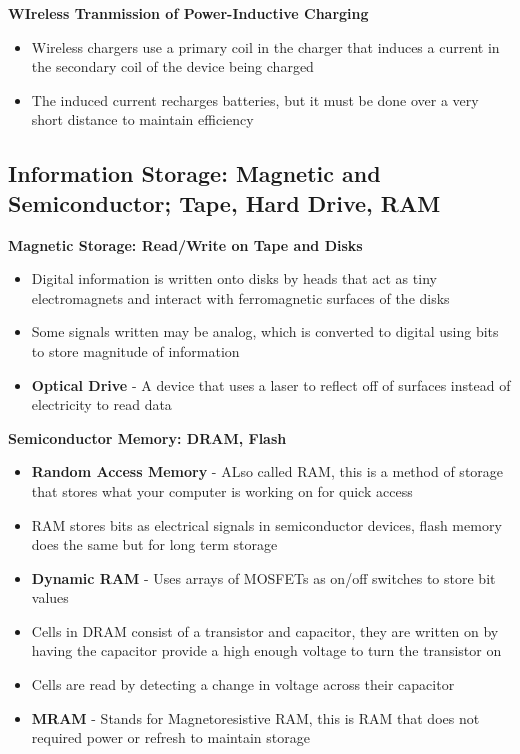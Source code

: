 \textbf{WIreless Tranmission of Power-Inductive Charging}
\begin{itemize}
    \item Wireless chargers use a primary coil in the charger that induces a current in the secondary coil of the device being charged
    \item The induced current recharges batteries, but it must be done over a very short distance to maintain efficiency
\end{itemize}

\subsection{Information Storage: Magnetic and Semiconductor; Tape, Hard Drive, RAM}
\textbf{Magnetic Storage: Read/Write on Tape and Disks}
\begin{itemize}
    \item Digital information is written onto disks by heads that act as tiny electromagnets and interact with ferromagnetic surfaces of the disks
    \item Some signals written may be analog, which is converted to digital using bits to store magnitude of information
    \item \textbf{Optical Drive} - A device that uses a laser to reflect off of surfaces instead of electricity to read data
\end{itemize}

\textbf{Semiconductor Memory: DRAM, Flash}
\begin{itemize}
    \item \textbf{Random Access Memory} - ALso called RAM, this is a method of storage that stores what your computer is working on for quick access
    \item RAM stores bits as electrical signals in semiconductor devices, flash memory does the same but for long term storage
    \item \textbf{Dynamic RAM} - Uses arrays of MOSFETs as on/off switches to store bit values
    \item Cells in DRAM consist of a transistor and capacitor, they are written on by having the capacitor provide a high enough voltage to turn the transistor on 
    \item Cells are read by detecting a change in voltage across their capacitor
    \item \textbf{MRAM} - Stands for Magnetoresistive RAM, this is RAM that does not required power or refresh to maintain storage
\end{itemize}

